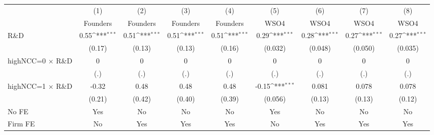 {
\def\sym#1{\ifmmode^{#1}\else\(^{#1}\)\fi}
\begin{tabular}{l*{8}{c}}
\toprule
                    &\multicolumn{1}{c}{(1)}&\multicolumn{1}{c}{(2)}&\multicolumn{1}{c}{(3)}&\multicolumn{1}{c}{(4)}&\multicolumn{1}{c}{(5)}&\multicolumn{1}{c}{(6)}&\multicolumn{1}{c}{(7)}&\multicolumn{1}{c}{(8)}\\
                    &\multicolumn{1}{c}{Founders}&\multicolumn{1}{c}{Founders}&\multicolumn{1}{c}{Founders}&\multicolumn{1}{c}{Founders}&\multicolumn{1}{c}{WSO4}&\multicolumn{1}{c}{WSO4}&\multicolumn{1}{c}{WSO4}&\multicolumn{1}{c}{WSO4}\\
\midrule
R\&D                &        0.55\sym{***}&        0.51\sym{***}&        0.51\sym{***}&        0.51\sym{***}&        0.29\sym{***}&        0.28\sym{***}&        0.27\sym{***}&        0.27\sym{***}\\
                    &      (0.17)         &      (0.13)         &      (0.13)         &      (0.16)         &     (0.032)         &     (0.048)         &     (0.050)         &     (0.035)         \\
\addlinespace
highNCC=0 $\times$ R\&D&           0         &           0         &           0         &           0         &           0         &           0         &           0         &           0         \\
                    &         (.)         &         (.)         &         (.)         &         (.)         &         (.)         &         (.)         &         (.)         &         (.)         \\
\addlinespace
highNCC=1 $\times$ R\&D&       -0.32         &        0.48         &        0.48         &        0.48         &       -0.15\sym{***}&       0.081         &       0.078         &       0.078         \\
                    &      (0.21)         &      (0.42)         &      (0.40)         &      (0.39)         &     (0.056)         &      (0.13)         &      (0.13)         &      (0.12)         \\
\addlinespace
No FE               &         Yes         &          No         &          No         &          No         &         Yes         &          No         &          No         &          No         \\
\addlinespace
Firm FE             &          No         &         Yes         &         Yes         &         Yes         &          No         &         Yes         &         Yes         &         Yes         \\

\end{tabular}}
